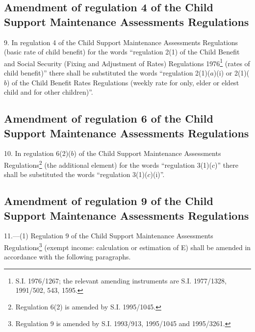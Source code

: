 \documentclass[a4paper]{article}
\begin{document}
\subsection[9. Amendment of regulation 4 of the Child Support Maintenance Assessments Regulations]{Amendment of regulation 4 of the Child Support Maintenance Assessments Regulations}

9.  In regulation 4 of the Child Support Maintenance Assessments Regulations (basic rate of child benefit) for the words “regulation 2(1) of the Child Benefit and Social Security (Fixing and Adjustment of Rates) Regulations 1976\footnote{\frenchspacing S.I. 1976/1267; the relevant amending instruments are S.I. 1977/1328, 1991/502, 543, 1595.} (rates of child benefit)” there shall be substituted the words “regulation 2(1)($a$)(i) or 2(1)($b$) of the Child Benefit Rates Regulations (weekly rate for only, elder or eldest child and for other children)”.

\subsection[10. Amendment of regulation 6 of the Child Support Maintenance Assessments Regulations]{Amendment of regulation 6 of the Child Support Maintenance Assessments Regulations}

10.  In regulation 6(2)($b$) of the Child Support Maintenance Assessments Regulations\footnote{\frenchspacing Regulation 6(2) is amended by S.I. 1995/1045.} (the additional element) for the words “regulation 3(1)($c$)” there shall be substituted the words “regulation 3(1)($c$)(i)”.

\subsection[11. Amendment of regulation 9 of the Child Support Maintenance Assessments Regulations]{Amendment of regulation 9 of the Child Support Maintenance Assessments Regulations}

11.—(1) Regulation 9 of the Child Support Maintenance Assessments Regulations\footnote{\frenchspacing Regulation 9 is amended by S.I. 1993/913, 1995/1045 and 1995/3261.} (exempt income: calculation or estimation of E) shall be amended in accordance with the following paragraphs.
\end{document}
